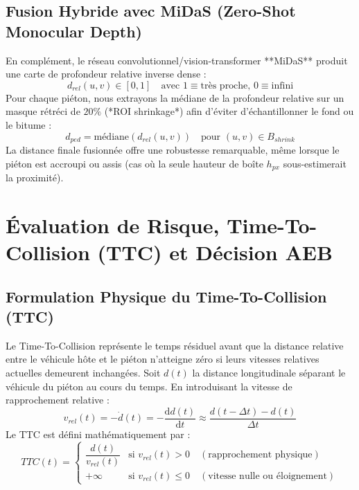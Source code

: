\documentclass[11pt,a4paper]{article}
\begin{document}
\subsection{Fusion Hybride avec MiDaS (Zero-Shot Monocular Depth)}
En complément, le réseau convolutionnel/vision-transformer **MiDaS** produit une carte de profondeur relative inverse dense :
\begin{equation}
    d_{rel}(u, v) \in [0, 1] \quad \text{avec } 1 \equiv \text{très proche, } 0 \equiv \text{infini}
\end{equation}
Pour chaque piéton, nous extrayons la médiane de la profondeur relative sur un masque rétréci de $20\%$ (*ROI shrinkage*) afin d'éviter d'échantillonner le fond ou le bitume :
\begin{equation}
    d_{ped} = \text{médiane}\left( d_{rel}(u, v) \right) \quad \text{pour } (u, v) \in B_{shrink}
\end{equation}
La distance finale fusionnée offre une robustesse remarquable, même lorsque le piéton est accroupi ou assis (cas où la seule hauteur de boîte $h_{px}$ sous-estimerait la proximité).

\section{Évaluation de Risque, Time-To-Collision (TTC) et Décision AEB}

\subsection{Formulation Physique du Time-To-Collision (TTC)}
Le Time-To-Collision représente le temps résiduel avant que la distance relative entre le véhicule hôte et le piéton n'atteigne zéro si leurs vitesses relatives actuelles demeurent inchangées.
Soit $d(t)$ la distance longitudinale séparant le véhicule du piéton au cours du temps. En introduisant la vitesse de rapprochement relative :
\begin{equation}
    v_{rel}(t) = -\dot{d}(t) = -\frac{\mathrm{d}d(t)}{\mathrm{d}t} \approx \frac{d(t - \Delta t) - d(t)}{\Delta t}
\end{equation}
Le TTC est défini mathématiquement par :
\begin{equation}
    TTC(t) = \begin{cases}
        \dfrac{d(t)}{v_{rel}(t)} & \text{si } v_{rel}(t) > 0 \quad (\text{rapprochement physique}) \\
        +\infty & \text{si } v_{rel}(t) \le 0 \quad (\text{vitesse nulle ou éloignement})
    \end{cases}
\end{equation}
\end{document}

